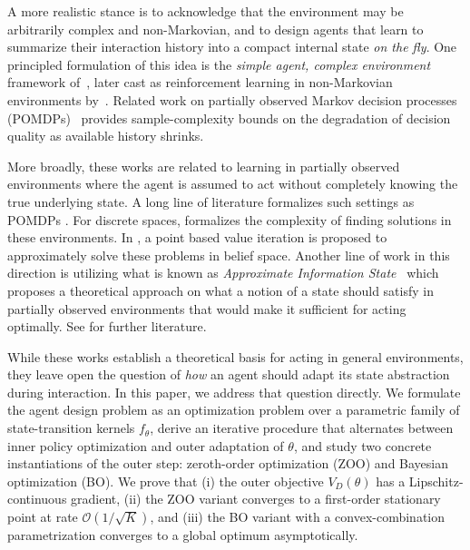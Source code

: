 \documentclass[12pt]{article}
\renewcommand{\[}{\left[}
\renewcommand{\]}{\right]}
\renewcommand{\(}{\left(}
\renewcommand{\)}{\right)}
\newcounter{l1}
\newcounter{l2}
\newcounter{l3}
\begin{document}
A more realistic stance is to acknowledge that the environment may be arbitrarily
complex and non-Markovian, and to design agents that learn to summarize their
interaction history into a compact internal state \emph{on the fly}. One principled
formulation of this idea is the \emph{simple agent, complex environment} framework
of~\cite{JMLR:v23:21-0773}, later cast as reinforcement learning in non-Markovian
environments by~\cite{chandak2024reinforcement}. Related work on partially observed
Markov decision processes (POMDPs)~\cite{sinha2024agent,anjarlekarscalable} provides
sample-complexity bounds on the degradation of decision quality as available history
shrinks.

More broadly, these works are related to learning in partially observed environments where the agent is assumed to act without completely knowing the true underlying state. A long line of literature formalizes such settings as POMDPs \cite{aastrom1965optimal}. For discrete spaces, \cite{kaelbling1998planning} formalizes the complexity of finding solutions in these environments. In
 \cite{pineau2003point},  a point based value iteration is proposed to approximately solve these problems in belief space. Another line of work in this direction is utilizing what is known as \emph{Approximate Information State}~\cite{subramanian2022approximate} which proposes a theoretical approach on what a notion of a state should satisfy in partially observed environments that would make it sufficient for acting optimally. See \cite{yuksel2024stochastic} for further literature.

While these works establish a theoretical basis for acting in general environments,
they leave open the question of \emph{how} an agent should adapt its state abstraction
during interaction. In this paper, we address that question directly. We formulate the agent design problem
as an optimization problem over a parametric family of state-transition kernels
$f_\theta$, derive an iterative procedure that alternates between inner policy
optimization and outer adaptation of $\theta$, and study two concrete instantiations of
the outer step: zeroth-order optimization (ZOO) and Bayesian optimization (BO).
We prove that (i) the outer objective $V_D(\theta)$ has a Lipschitz-continuous gradient,
(ii) the ZOO variant converges to a first-order stationary point at rate
$\mathcal{O}(1/\sqrt{K})$, and (iii) the BO variant with a convex-combination
parametrization converges to a global optimum asymptotically.
\end{document}

